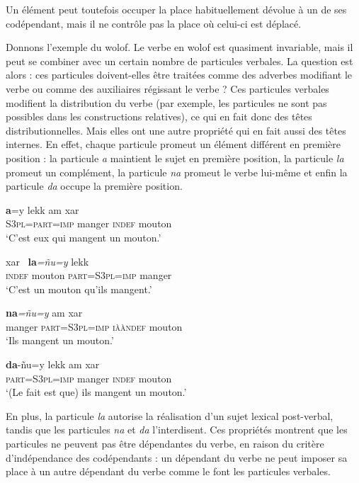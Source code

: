 Un élément peut toutefois occuper la place habituellement dévolue à un de ses codépendant, mais il ne contrôle pas la place où celui-ci est déplacé.

Donnons l’exemple du wolof. Le verbe en wolof est quasiment invariable, mais il peut se combiner avec un certain nombre de particules verbales. La question est alors : ces particules doivent-elles être traitées comme des adverbes modifiant le verbe ou comme des auxiliaires régissant le verbe ? Ces particules verbales modifient la distribution du verbe (par exemple, les particules ne sont pas possibles dans les constructions relatives), ce qui en fait donc des têtes distributionnelles. Mais elles ont une autre propriété qui en fait aussi des têtes internes. En effet, chaque particule promeut un élément différent en première position : la particule \textit{a} maintient le sujet en première position, la particule \textit{la} promeut un complément, la particule \textit{na} promeut le verbe lui-même et enfin la particule \textit{da} occupe la première position.

\ea
{}\textbf{{a}}{=y}                {lekk}          {am}       {xar~}\\
\textsc{S3pl=part=imp} manger  \textsc{indef}  mouton\\
\glt `C’est eux qui mangent un mouton.’
\z

\ea
{}       {xar~}          \textbf{{la}}\textit{=ñu=y}               {lekk}\\
\textsc{indef}  mouton  \textsc{part=S3pl=imp} manger\\
\glt `C’est un mouton qu’ils mangent.’
\z

\ea
{}       \textbf{{na}}\textit{=ñu=y}             {am}       {xar~}\\
manger  \textsc{part=S3pl=imp} \textsc{iààndef}  mouton\\
\glt `Ils mangent un mouton.’
\z

\ea
\gll \textbf{{da}}{{}-ñu=y              lekk         am      xar~}\\
\textsc{part=S3pl=imp} manger  \textsc{indef}  mouton\\
\glt `(Le fait est que) ils mangent un mouton.’
\z

En plus, la particule \textit{la} autorise la réalisation d’un sujet lexical post-verbal, tandis que les particules \textit{na} et \textit{da} l’interdisent. Ces propriétés montrent que les particules ne peuvent pas être dépendantes du verbe, en raison du critère d’indépendance des codépendants : un dépendant du verbe ne peut imposer sa place à un autre dépendant du verbe comme le font les particules verbales.

